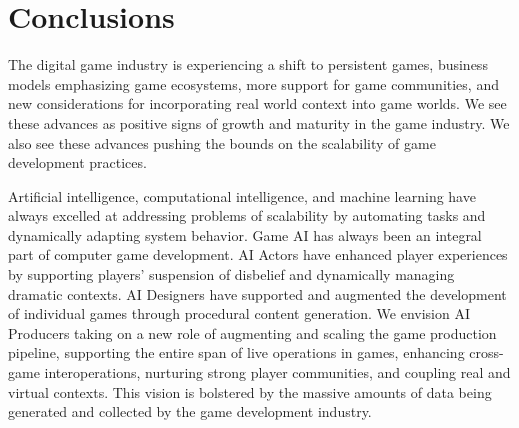 \documentclass[conference]{IEEEtran}
\begin{document}
%


\section{Conclusions}

The digital game industry is experiencing a shift to persistent games, business models emphasizing game ecosystems, more support for game communities, and new considerations for incorporating real world context into game worlds.
We see these advances as positive signs of growth and maturity in the game industry.
We also see these advances pushing the bounds on the scalability of game development practices.

Artificial intelligence, computational intelligence, and machine learning have always excelled at addressing problems of scalability by automating tasks and dynamically adapting system behavior.
Game AI
has always been an integral part of computer game development.
AI Actors have enhanced player experiences by supporting players' suspension of disbelief and dynamically managing dramatic contexts.
AI Designers have supported and augmented the development of individual games through procedural content generation.
%
We envision AI Producers taking on a new role of augmenting and scaling the game production pipeline, supporting the entire span of live operations in games, enhancing cross-game interoperations, nurturing strong player communities, and coupling real and virtual contexts.
This vision is bolstered by the massive amounts of data being generated and collected by the game development industry.
\end{document}
